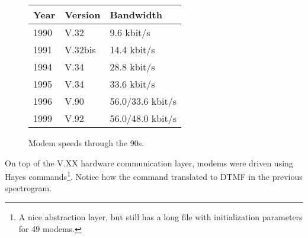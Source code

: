  \begin{figure}[H]
\centering  
\begin{tabularx}{\textwidth}{ L{0.2} L{0.3} L{0.5}}
  \toprule
  \textbf{Year} & \textbf{Version} & \textbf{Bandwidth} \\
  \toprule 
   
    1990 & V.32 & 9.6 kbit/s \\
    1991 & V.32bis &  14.4 kbit/s \\
    1994 & V.34 & 28.8 kbit/s \\
    1995 & V.34 & 33.6 kbit/s \\
    1996 & V.90 & 56.0/33.6 kbit/s\\
    1999 & V.92 & 56.0/48.0 kbit/s\\
   
   \toprule
\end{tabularx}
\caption{Modem speeds through the 90s.\protect\footnotemark}
\end{figure}

\vspace{-10pt}
\par
On top of the V.XX hardware communication layer, modems were driven using Hayes commands\footnote{A nice abstraction layer, but \doom{} still has a long file with initialization parameters for 49 modems.}. Notice how the command  translated to DTMF in the previous spectrogram.\\%


